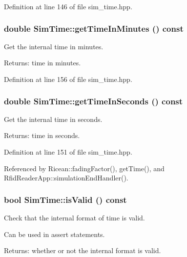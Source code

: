 Definition at line 146 of file sim\_\-time.hpp.
\subsubsection{\setlength{\rightskip}{0pt plus 5cm}double Sim\-Time::get\-Time\-In\-Minutes () const\hspace{0.3cm}{\tt  [inline]}}\label{classSimTime_71435a2c259e3bcf89a6d952b464e7c2}


Get the internal time in minutes. 

\begin{Desc}
\item[Returns:]time in minutes. \end{Desc}


Definition at line 156 of file sim\_\-time.hpp.
\subsubsection{\setlength{\rightskip}{0pt plus 5cm}double Sim\-Time::get\-Time\-In\-Seconds () const\hspace{0.3cm}{\tt  [inline]}}\label{classSimTime_4525fb479682c17294f646fb48c7d9ee}


Get the internal time in seconds. 

\begin{Desc}
\item[Returns:]time in seconds. \end{Desc}


Definition at line 151 of file sim\_\-time.hpp.

Referenced by Ricean::fading\-Factor(), get\-Time(), and Rfid\-Reader\-App::simulation\-End\-Handler().
\subsubsection{\setlength{\rightskip}{0pt plus 5cm}bool Sim\-Time::is\-Valid () const\hspace{0.3cm}{\tt  [inline]}}\label{classSimTime_7aa2ac42b19f7fe629f47b6eed7904a4}


Check that the internal format of time is valid. 

Can be used in assert statements. \begin{Desc}
\item[Returns:]whether or not the internal format is valid. \end{Desc}


